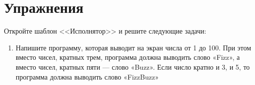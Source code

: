 \documentclass[../index.tex]{subfiles}
\begin{document}
\section{Упражнения}
    
    Откройте шаблон <<Исполнятор>> и решите следующие задачи:
    
    \begin{enumerate}
    \item Напишите программу, которая выводит на экран числа от 1 до 100. При этом вместо чисел, кратных трем, программа должна выводить слово «Fizz», а вместо чисел, кратных пяти — слово «Buzz». Если число кратно и 3, и 5, то программа должна выводить слово «FizzBuzz»
    
    \end{enumerate}
\end{document}
